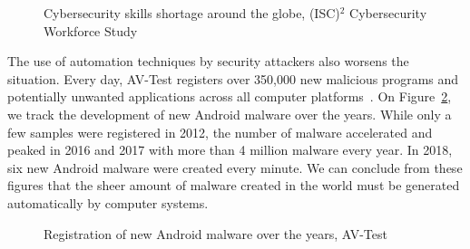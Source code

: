 \begin{figure}[!ht]
        \centering
        \caption[Cybersecurity skills shortage around the globe]{Cybersecurity skills shortage around the globe, (ISC)$^2$ Cybersecurity Workforce Study~\cite{ics2_cybersecurity_2018}}
	\label{figure:introduction:expertise}
\end{figure}

The use of automation techniques by security attackers also worsens the situation.
Every day, AV-Test registers over 350,000 new malicious programs and potentially unwanted applications across all computer platforms~\cite{av-test_malware_2019}.
On Figure~\ref{figure:introduction:profusion}, we track the development of new Android malware over the years.
While only a few samples were registered in 2012, the number of malware accelerated and peaked in 2016 and 2017 with more than 4 million malware every year.
In 2018, six new Android malware were created every minute.
We can conclude from these figures that the sheer amount of malware created in the world must be generated automatically by computer systems.

\begin{figure}[!ht]
        \centering
        \caption[Registration of new Android malware over the years]{Registration of new Android malware over the years, AV-Test~\cite{av-test_malware_2019}}
	\label{figure:introduction:profusion}
\end{figure}

